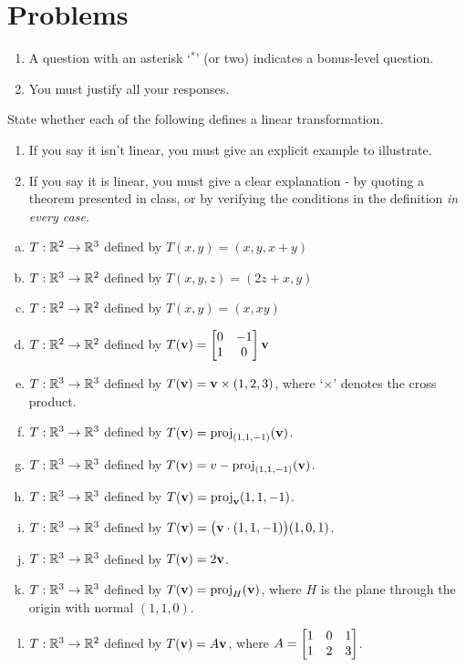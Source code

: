 \section*{Problems}


\begin{enumerate}
\item A question with an asterisk `$ ^\ast$' (or two) indicates a bonus-level question.
 \item You must justify all your responses.
\end{enumerate}
\bigskip


 \begin{prob} \label{prob24.1} State whether each of the following defines a linear transformation.    
   \smallskip    
\begin{enumerate}[$\bullet$]
\item If you say it isn't linear, you must give an explicit example to illustrate.   
\item If you say it is linear, you must give a clear explanation -   by quoting a theorem presented in class, or by verifying the conditions in the definition {\it  in every  case}. 
\end{enumerate}
\medskip
\begin{enumerate}[a)]
\item  $T:\mathbb{R}^2 \to \mathbb{R}^3$ defined by $T(x,y)=(x, y, x+y)$
\medskip
%
\item\sov $T:\mathbb{R}^3 \to \mathbb{R}^2$ defined by $T(x,y,z)=(2 z+x, y)$
\medskip
%
\item $T:\mathbb{R}^2 \to \mathbb{R}^2$ defined by $T(x,y)=(x, x y)$
\medskip
%

\item\sov $T:\mathbb{R}^2 \to \mathbb{R}^2$ defined by $T(\vv)=\bmatrix 0&-1\\ 1&0 \endbmatrix \vv$
\medskip
%
\item $T:\mathbb{R}^3 \to \mathbb{R}^3$ defined by $T(\mathbf{v})= \mathbf{v}\times (1,2,3)$, where `$\times$' denotes the cross product.
\medskip
%

\item\sov $T:\mathbb{R}^3 \to \mathbb{R}^3$ defined by $T(\mathbf{v})= \operatorname{proj}_{(1,1,-1)}(\mathbf{v})$.
\medskip
%
\item $T:\mathbb{R}^3 \to \mathbb{R}^3$ defined by $T(\mathbf{v})= v-\operatorname{proj}_{(1,1,-1)}(\mathbf{v})$.
\medskip
%
\item\sov $T:\mathbb{R}^3 \to \mathbb{R}^3$ defined by $T(\mathbf{v})= \operatorname{proj}_{\mathbf{v}}(1,1,-1)$.
\medskip
%
\item $T:\mathbb{R}^3 \to \mathbb{R}^3$ defined by $T(\mathbf{v})= \big(\mathbf{v} \cdot (1,1,-1)\big) (1,0,1)$.
\medskip
%
\item\sov $T:\mathbb{R}^3 \to \mathbb{R}^3$ defined by $T(\mathbf{v})= 2 \mathbf{v}$.
\medskip
%
\item $T:\mathbb{R}^3 \to \mathbb{R}^3$ defined by $T(\mathbf{v})= \operatorname{proj}_H(\mathbf{v})$, where $H$ is the plane through the origin with normal $(1,1,0)$.
\medskip
%
\item\sov $T:\mathbb{R}^3 \to \mathbb{R}^2$ defined by $T(\mathbf{v})= A\mathbf{v}$, where $A=\bmatrix 1&0&1\\ 1&2&3\endbmatrix$.
\medskip


\end{enumerate}
\end{prob}
